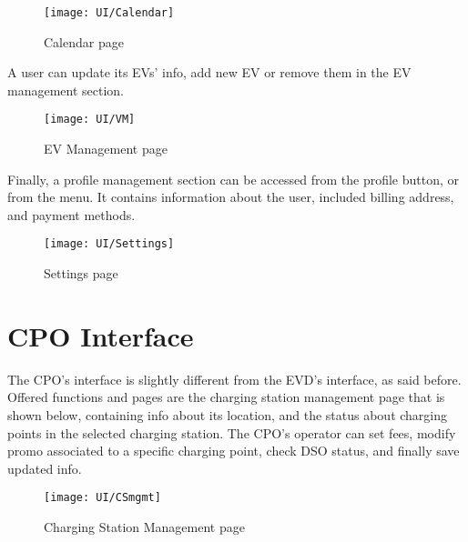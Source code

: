 \begin{figure} [H]
    \begin{center}
        \texttt{[image: UI/Calendar]}
        \caption{Calendar page}
        \label{fig: calendar}
    \end{center}
\end{figure}

A user can update its EVs’ info, add new EV or remove them in the EV management section.

\begin{figure} [H]
    \begin{center}
        \texttt{[image: UI/VM]}
        \caption{EV Management page}
        \label{fig: vm}
    \end{center}
\end{figure}

Finally, a profile management section can be accessed from the profile button, or from the menu.
It contains information about the user, included billing address, and payment methods.

\begin{figure} [H]
    \begin{center}
        \texttt{[image: UI/Settings]}
        \caption{Settings page}
        \label{fig: settings}
    \end{center}
\end{figure}


\section{CPO Interface}
\label{sec: cpo_interface}%

The CPO’s interface is slightly different from the EVD’s interface, as said before.
Offered functions and pages are the charging station management page that is shown below, containing info about its location, and the status about charging points in the selected charging station.
The CPO’s operator can set fees, modify promo associated to a specific charging point, check DSO status, and finally save updated info.

\begin{figure} [H]
    \begin{center}
        \texttt{[image: UI/CSmgmt]}
        \caption{Charging Station Management page}
        \label{fig: csmgmt}
    \end{center}
\end{figure}

